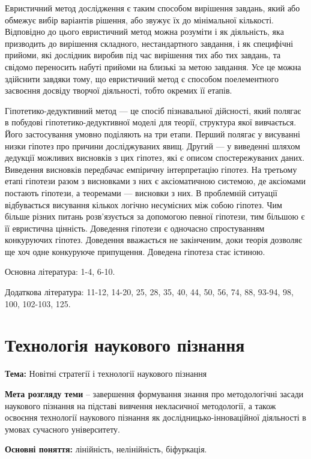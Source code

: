 Евристичний метод дослідження є таким способом вирішення завдань, який
або обмежує вибір варіантів рішення, або звужує їх до мінімальної кількості.
Відповідно до цього евристичний метод можна розуміти і як діяльність, яка
призводить до вирішення складного, нестандартного завдання, і як специфічні
прийоми, які дослідник виробив під час вирішення тих або тих завдань, та
свідомо переносить набуті прийоми на близькі за метою завдання. Усе це
можна здійснити завдяки тому, що евристичний метод є способом
поелементного засвоєння досвіду творчої діяльності, тобто окремих її етапів.

Гіпотетико-дедуктивний метод --- це спосіб пізнавальної дійсності, який
полягає в побудові гіпотетико-дедуктивної моделі для теорії, структура якої
вивчається. Його застосування умовно поділяють на три етапи. Перший полягає
у висуванні низки гіпотез про причини досліджуваних явищ. Другий --- у
виведенні шляхом дедукції можливих висновків з цих гіпотез, які є описом
спостережуваних даних. Виведення висновків передбачає емпіричну
інтерпретацію гіпотез. На третьому етапі гіпотези разом з висновками з них є
аксіоматичною системою, де аксіомами постають гіпотези, а теоремами ---
висновки з них. В проблемній ситуації відбувається висування кількох логічно
несумісних між собою гіпотез. Чим більше різних питань розв’язується за
допомогою певної гіпотези, тим більшою є її евристична цінність. Доведення
гіпотези є одночасно спростуванням конкуруючих гіпотез. Доведення
вважається не закінченим, доки теорія дозволяє ще хоч одне конкуруюче
припущення. Доведена гіпотеза стає істиною.

Основна література: 1-4, 6-10.

Додаткова література: 11-12, 14-20, 25, 28, 35, 40, 44, 50, 56, 74, 88, 93-94,
98, 100, 102-103, 125.

\section{Технологія наукового пізнання}

\textbf{Тема:} Новітні стратегії і технології наукового пізнання

\textbf{Мета розгляду теми} – завершення формування знання про методологічні
засади наукового пізнання на підставі вивчення некласичної методології, а
також освоєння технології наукового пізнання як дослідницько-інноваційної
діяльності в умовах сучасного університету.

\textbf{Основні поняття:} лінійність, нелінійність, біфуркація.

